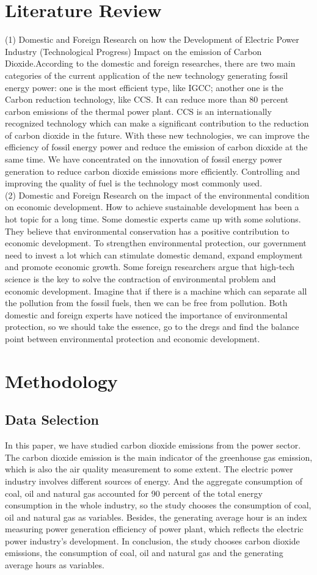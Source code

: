 \documentclass{article}
\begin{document}
  \section{Literature Review} (1) Domestic and Foreign Research on how the Development of Electric Power Industry (Technological Progress) Impact on the emission of Carbon Dioxide.According to the domestic and foreign researches, there are two main categories of the current application of the new technology generating fossil energy power: one is the most efficient type, like IGCC; another one is the Carbon reduction technology, like CCS. It can reduce more than 80 percent carbon emissions of the thermal power plant. CCS is an internationally recognized technology which can make a significant contribution to the reduction of carbon dioxide in the future. With these new technologies, we can improve the efficiency of fossil energy power and reduce the emission of carbon dioxide at the same time. We have concentrated on the innovation of fossil energy power generation to reduce carbon dioxide emissions more efficiently. Controlling and improving the quality of fuel is the technology most commonly used.
\\(2) Domestic and Foreign Research on the impact of the environmental condition on economic development.
How to achieve sustainable development has been a hot topic for a long time. Some domestic experts came up with some solutions. They believe that environmental conservation has a positive contribution to economic development. To strengthen environmental protection, our government need to invest a lot which can stimulate domestic demand, expand employment and promote economic growth. Some foreign researchers argue that high-tech science is the key to solve the contraction of environmental problem and economic development. Imagine that if there is a machine which can separate all the pollution from the fossil fuels, then we can be free from pollution. Both domestic and foreign experts have noticed the importance of environmental protection, so we should take the essence, go to the dregs and find the balance point between environmental protection and economic development.
  \section{Methodology}
      \subsection{ Data Selection} In this paper, we have studied carbon dioxide emissions from the power sector. The carbon dioxide emission is the main indicator of the greenhouse gas emission, which is also the air quality measurement to some extent. The electric power industry involves different sources of energy. And the aggregate consumption of coal, oil and natural gas accounted for 90 percent of the total energy consumption in the whole industry, so the study chooses the consumption of coal, oil and natural gas as variables. Besides, the generating average hour is an index measuring power generation efficiency of power plant, which reflects the electric power industry’s development. In conclusion, the study chooses carbon dioxide emissions, the consumption of coal, oil and natural gas and the generating average hours as variables.
\end{document}
